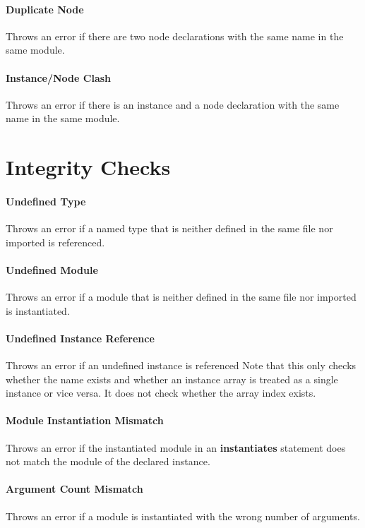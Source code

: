 \documentclass[a4paper,11pt,twoside]{report}
\begin{document}
{{{\paragraph{Duplicate Node}
Throws an error if there are two node declarations with the same name in the same module.

\paragraph{Instance/Node Clash}
Throws an error if there is an instance and a node declaration with the same name in the same module.

\section{Integrity Checks}

\paragraph{Undefined Type}
Throws an error if a named type that is neither defined in the same file nor imported is referenced.

\paragraph{Undefined Module}
Throws an error if a module that is neither defined in the same file nor imported is instantiated.

\paragraph{Undefined Instance Reference}
Throws an error if an undefined instance is referenced
Note that this only checks whether the name exists and whether an instance array is treated as a single instance or vice versa.
It does not check whether the array index exists.

\paragraph{Module Instantiation Mismatch}
Throws an error if the instantiated module in an \textbf{instantiates} statement does not match the module of the declared instance.

\paragraph{Argument Count Mismatch}
Throws an error if a module is instantiated with the wrong number of arguments.

}}}
\end{document}
